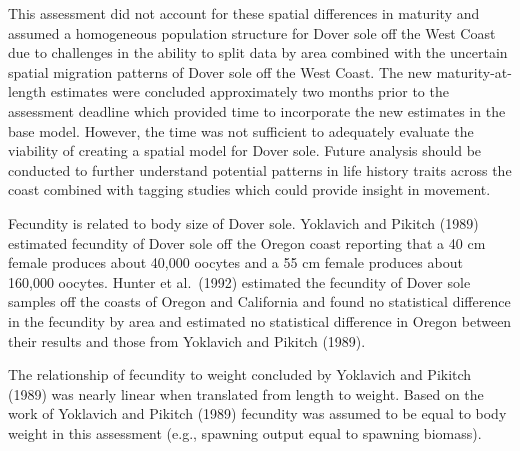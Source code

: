 \documentclass[11pt,
  english,
  a4paper,
]{article}
\begin{document}
\leavevmode\tagmcend\tagstructend\par


This assessment did not account for these spatial differences in maturity and assumed a homogeneous population structure for Dover sole off the West Coast due to challenges in the ability to split data by area combined with the uncertain spatial migration patterns of Dover sole off the West Coast. The new maturity-at-length estimates were concluded approximately two months prior to the assessment deadline which provided time to incorporate the new estimates in the base model. However, the time was not sufficient to adequately evaluate the viability of creating a spatial model for Dover sole. Future analysis should be conducted to further understand potential patterns in life history traits across the coast combined with tagging studies which could provide insight in movement.

\leavevmode\tagmcend\tagstructend\par


Fecundity is related to body size of Dover sole. Yoklavich and Pikitch {(1989)\leavevmode\tagmcend\tagstructend} estimated fecundity of Dover sole off the Oregon coast reporting that a 40 cm female produces about 40,000 oocytes and a 55 cm female produces about 160,000 oocytes. Hunter et al.~{(1992)\leavevmode\tagmcend\tagstructend} estimated the fecundity of Dover sole samples off the coasts of Oregon and California and found no statistical difference in the fecundity by area and estimated no statistical difference in Oregon between their results and those from Yoklavich and Pikitch {(1989)\leavevmode\tagmcend\tagstructend}.

\leavevmode\tagmcend\tagstructend\par


The relationship of fecundity to weight concluded by Yoklavich and Pikitch {(1989)\leavevmode\tagmcend\tagstructend} was nearly linear when translated from length to weight. Based on the work of Yoklavich and Pikitch {(1989)\leavevmode\tagmcend\tagstructend} fecundity was assumed to be equal to body weight in this assessment (e.g., spawning output equal to spawning biomass).
\end{document}
